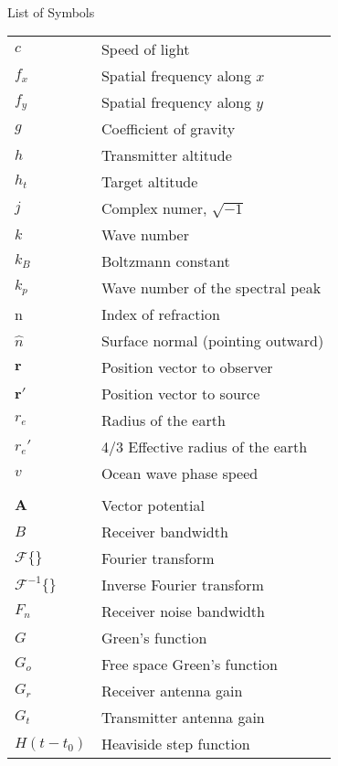 \renewcommand{\baselinestretch}{1}
\small\normalsize
\hbox{\ }

\vspace{-4em}

\begin{center}
\large{List of Symbols}
\end{center} 

\vspace{3pt}

\begin{supertabular}{ll}
$c$ & Speed of light \\
$f_x$ & Spatial frequency along $x$ \\
$f_y$ & Spatial frequency along $y$ \\
$g$ & Coefficient of gravity \\
$h$ & Transmitter altitude\\
$h_t$ & Target altitude \\
$j$ & Complex numer, $\sqrt{-1}$ \\
$k$ & Wave number \\
$k_B$ & Boltzmann constant \\
$k_p$ & Wave number of the spectral peak \\
n & Index of refraction \\
$\hat{n}$ & Surface normal (pointing outward) \\
$\mathbf{r}$ & Position vector to observer \\
$\mathbf{r}'$ & Position vector to source \\
$r_e$ & Radius of the earth \\
$r_e'$ & 4/3 Effective radius of the earth \\
$v$ & Ocean wave phase speed \\
\\
$\mathbf{A}$ & Vector potential \\
$B$ & Receiver bandwidth \\
$\mathcal{F}\{\}$ & Fourier transform \\
$\mathcal{F}^{-1}\{\}$ & Inverse Fourier transform \\
$F_n$ & Receiver noise bandwidth \\
$G$ & Green's function \\
$G_o$ & Free space Green's function \\
$G_r$ & Receiver antenna gain \\
$G_t$ & Transmitter antenna gain \\
$H(t-t_0)$ & Heaviside step function \\

\end{supertabular}
